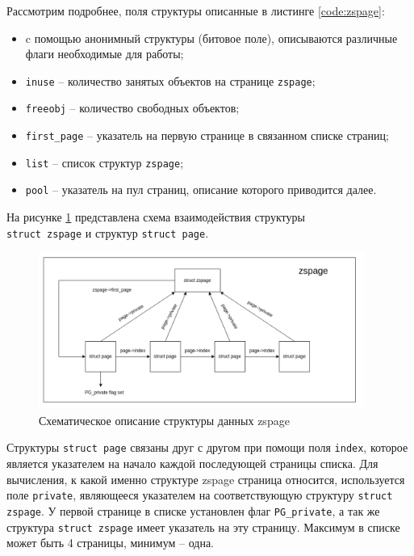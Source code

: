 Рассмотрим подробнее, поля структуры описанные в листинге \ref{code:zspage}:

\begin{itemize}
	\item c помощью анонимный структуры (битовое поле), описываются различные флаги необходимые для работы;
	\item \texttt{inuse} -- количество занятых объектов на странице \texttt{zspage};
	\item \texttt{freeobj} -- количество свободных объектов;
	\item \texttt{first\_page} -- указатель на первую странице в связанном списке страниц;
	\item \texttt{list} -- список структур \texttt{zspage};
	\item \texttt{pool} -- указатель на пул страниц, описание которого приводится далее.
\end{itemize}

На рисунке \ref{fig:zspage} представлена схема взаимодействия структуры\\ \texttt{struct zspage} и структур \texttt{struct page}.

\begin{figure}[h]
	\centering
	\includegraphics[width=0.95\textwidth]{img/zspage.png}
	\caption{Схематическое описание структуры данных zspage}
	\label{fig:zspage}
\end{figure}

Структуры \texttt{struct page} связаны друг с другом при помощи поля \texttt{index}, которое является указателем на начало каждой последующей страницы списка. Для вычисления, к какой именно структуре zspage страница относится, используется поле \texttt{private}, являющееся указателем на соответствующую структуру \texttt{struct zspage}. У первой странице в списке установлен флаг \texttt{PG\_private}, а так же структура \texttt{struct zspage} имеет указатель на эту страницу. Максимум в списке может быть 4 страницы, минимум -- одна.


